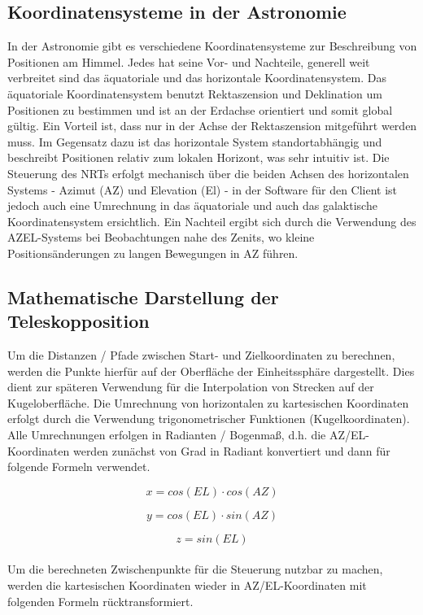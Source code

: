 \subsection{Koordinatensysteme in der Astronomie}

In der Astronomie gibt es verschiedene Koordinatensysteme zur Beschreibung von Positionen am Himmel. Jedes hat seine Vor- und Nachteile, generell weit verbreitet sind das äquatoriale und das horizontale Koordinatensystem.
Das äquatoriale Koordinatensystem benutzt Rektaszension und Deklination um Positionen zu bestimmen und ist an der Erdachse orientiert und somit global gültig. Ein Vorteil ist, dass nur in der Achse der Rektaszension mitgeführt werden muss.
Im Gegensatz dazu ist das horizontale System standortabhängig und beschreibt Positionen relativ zum lokalen Horizont, was sehr intuitiv ist. Die Steuerung des NRTs erfolgt mechanisch über die beiden Achsen des horizontalen Systems - Azimut (AZ) und Elevation (El) - in der Software für den Client ist jedoch auch eine Umrechnung in das äquatoriale und auch das galaktische Koordinatensystem ersichtlich. 
Ein Nachteil ergibt sich durch die Verwendung des AZEL-Systems bei Beobachtungen nahe des Zenits, wo kleine Positionsänderungen zu langen Bewegungen in AZ führen.

\subsection{Mathematische Darstellung der Teleskopposition}

Um die Distanzen / Pfade zwischen Start- und Zielkoordinaten zu berechnen, werden die Punkte hierfür auf der Oberfläche der Einheitssphäre dargestellt. Dies dient zur späteren Verwendung für die Interpolation von Strecken auf der Kugeloberfläche.
Die Umrechnung von horizontalen zu kartesischen Koordinaten erfolgt durch die Verwendung trigonometrischer Funktionen (Kugelkoordinaten). Alle Umrechnungen erfolgen in Radianten / Bogenmaß, d.h. die AZ/EL-Koordinaten werden zunächst von Grad in Radiant konvertiert und dann für folgende Formeln verwendet.

\begin{equation}
    x = cos(EL) \cdot cos(AZ)
    \label{cartesian_x}
\end{equation}

\begin{equation}
    y = cos(EL) \cdot sin(AZ)
    \label{cartesian_y}
\end{equation}

\begin{equation}
    z = sin(EL)
    \label{cartesian_z}
\end{equation}
\\
Um die berechneten Zwischenpunkte für die Steuerung nutzbar zu machen, werden die kartesischen Koordinaten wieder in AZ/EL-Koordinaten mit folgenden Formeln rücktransformiert.

